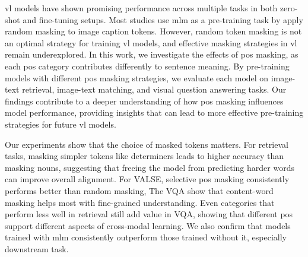 
\setlength{\parindent}{0pt}
\setlength{\parskip}{1em}
\setlength{\baselineskip}{1.5em}

\begin{center}
  \fontsize{14}{17}
\end{center}
\vspace{2em}

\acrfull{vl} models have shown promising performance across multiple tasks in both zero-shot and fine-tuning setups. 
Most studies use \acrlong{mlm} as a pre-training task by apply random masking to image caption tokens. 
However, random token masking is not an optimal strategy for training \acrshort{vl} models, and effective masking strategies in \acrshort{vl} remain underexplored. 
In this work, we investigate the effects of \acrfull{pos} masking, as each \acrshort{pos} category contributes differently to sentence meaning. 
By pre-training models with different \acrshort{pos} masking strategies, we evaluate each model on image-text retrieval, image-text matching, and visual question answering tasks.
Our findings contribute to a deeper understanding of how \acrshort{pos} masking influences model performance, providing insights that can lead to more effective pre-training strategies for future \acrshort{vl} models.

Our experiments show that the choice of masked tokens matters.
For retrieval tasks, masking simpler tokens like determiners leads to higher accuracy than masking nouns, suggesting that freeing the model from predicting harder words can improve overall alignment.
For VALSE, selective \acrshort{pos} masking consistently performs better than random masking, 
The VQA show that content-word masking helps most with fine-grained understanding.
Even categories that perform less well in retrieval still add value in VQA, showing that different \Acrshort{pos} support different aspects of cross-modal learning.
We also confirm that models trained with \acrshort{mlm} consistently outperform those trained without it, especially downstream task.

    
